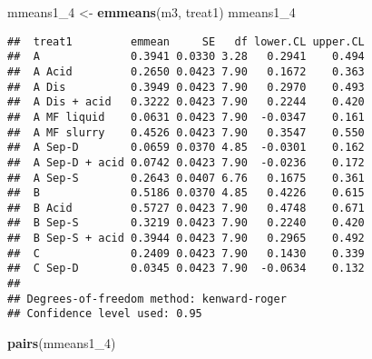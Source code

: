 \documentclass[
]{article}
\newenvironment{Shaded}{\begin{snugshade}}{\end{snugshade}}
\newcommand{\FunctionTok}[1]{\textcolor[rgb]{0.13,0.29,0.53}{\textbf{#1}}}
\newcommand{\NormalTok}[1]{#1}
\newcommand{\OtherTok}[1]{\textcolor[rgb]{0.56,0.35,0.01}{#1}}
\newcommand{\StringTok}[1]{\textcolor[rgb]{0.31,0.60,0.02}{#1}}
\begin{document}
\begin{Shaded}
\begin{Highlighting}[]
\NormalTok{mmeans1\_4 }\OtherTok{\textless{}{-}} \FunctionTok{emmeans}\NormalTok{(m3, }\StringTok{\textquotesingle{}treat1\textquotesingle{}}\NormalTok{)}
\NormalTok{mmeans1\_4}
\end{Highlighting}
\end{Shaded}

\begin{verbatim}
##  treat1         emmean     SE   df lower.CL upper.CL
##  A              0.3941 0.0330 3.28   0.2941    0.494
##  A Acid         0.2650 0.0423 7.90   0.1672    0.363
##  A Dis          0.3949 0.0423 7.90   0.2970    0.493
##  A Dis + acid   0.3222 0.0423 7.90   0.2244    0.420
##  A MF liquid    0.0631 0.0423 7.90  -0.0347    0.161
##  A MF slurry    0.4526 0.0423 7.90   0.3547    0.550
##  A Sep-D        0.0659 0.0370 4.85  -0.0301    0.162
##  A Sep-D + acid 0.0742 0.0423 7.90  -0.0236    0.172
##  A Sep-S        0.2643 0.0407 6.76   0.1675    0.361
##  B              0.5186 0.0370 4.85   0.4226    0.615
##  B Acid         0.5727 0.0423 7.90   0.4748    0.671
##  B Sep-S        0.3219 0.0423 7.90   0.2240    0.420
##  B Sep-S + acid 0.3944 0.0423 7.90   0.2965    0.492
##  C              0.2409 0.0423 7.90   0.1430    0.339
##  C Sep-D        0.0345 0.0423 7.90  -0.0634    0.132
## 
## Degrees-of-freedom method: kenward-roger 
## Confidence level used: 0.95
\end{verbatim}

\begin{Shaded}
\begin{Highlighting}[]
\FunctionTok{pairs}\NormalTok{(mmeans1\_4)}
\end{Highlighting}
\end{Shaded}
\end{document}
